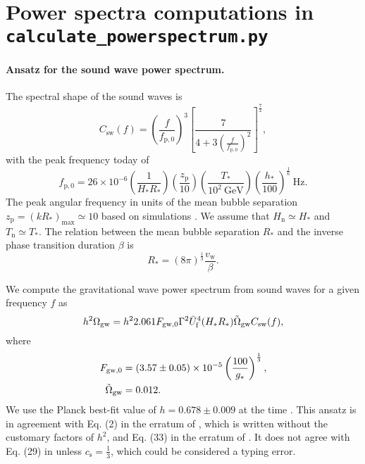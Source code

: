 \documentclass[10pt]{article}
\begin{document}
\section{Power spectra computations in \texttt{calculate\_powerspectrum.py}}

\paragraph{Ansatz for the sound wave power spectrum.}
The spectral shape of the sound waves is \cite{lisa19, shape17}
\begin{equation}
    C_\mathrm{sw}(f) = \left(\frac{f}{f_{\mathrm{p},0}}\right)^3 \left[\frac{7}{4+3\left(\frac{f}{f_{\mathrm{p},0}}\right)^2}\right]^{\frac{7}{2}},
\end{equation}
with the peak frequency today of
\begin{equation}
    f_{\mathrm{p},0} = 26\times10^{-6} \left(\frac{1}{H_* R_*}\right) \left(\frac{z_\mathrm{p}}{10}\right) \left(\frac{T_*}{10^2 \ \mathrm{GeV}}\right) \left(\frac{h_*}{100}\right)^{\frac{1}{6}} \ \mathrm{Hz}.
\end{equation}
The peak angular frequency in units of the mean bubble separation $z_{\mathrm{p}}=(kR_*)_{\mathrm{max}}\simeq10$ based on simulations \cite{lisa19, shape17}. We assume that $H_\mathrm{n}\simeq H_*$ and $T_\mathrm{n}\simeq T_*$. The relation between the mean bubble separation $R_*$ and the inverse phase transition duration $\beta$ is \cite{shape17}
\begin{equation}
    R_* = (8\pi)^{\frac{1}{3}} \frac{v_\mathrm{w}}{\beta}.
\end{equation}

We compute the gravitational wave power spectrum from sound waves for a given frequency $f$ as \cite{shape17}
\begin{equation}
    h^2\Omega_\mathrm{gw} = h^2 2.061 F_{\mathrm{gw},0} \Gamma^2 \Bar{U}_\mathrm{f}^4 (H_* R_*) \Tilde{\Omega}_\mathrm{gw} C_\mathrm{sw}(f),
\end{equation}
where
\begin{align}
    F_{\mathrm{gw},0} &= (3.57\pm0.05)\times10^{-5} \left(\frac{100}{g_*}\right)^{\frac{1}{3}}, \\
    \Tilde{\Omega}_\mathrm{gw}&=0.012.
\end{align}
We use the Planck best-fit value of $h=0.678\pm0.009$ at the time \cite{shape17}. This ansatz is in agreement with Eq. (2) in the erratum of \cite{shape17}, which is written without the customary factors of $h^2$, and Eq. (33) in the erratum of \cite{weir18}.
It does not agree with Eq. (29) in \cite{lisa19} unless $c_\mathrm{s}=\frac{1}{3}$, which could be considered a typing error.
\end{document}
